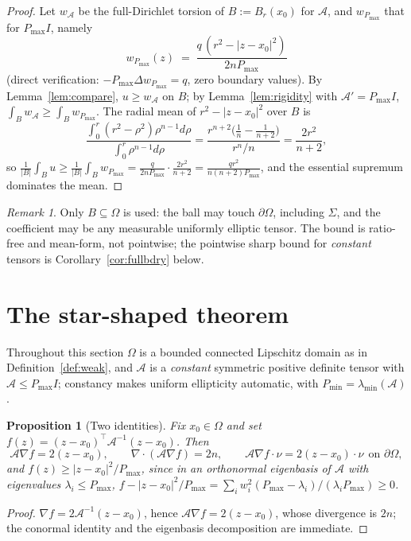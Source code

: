 \documentclass[10pt]{article}
\newtheorem{proposition}[theorem]{Proposition}
\theoremstyle{remark}
\newtheorem{remark}[theorem]{Remark}
\newcommand{\A}{\mathcal{A}}
\newcommand{\Om}{\Omega}
\newcommand{\Sig}{\Sigma}
\newcommand{\Pmax}{P_{\max}}
\newcommand{\Pmin}{P_{\min}}
\begin{document}
\begin{proof}
Let $w_\A$ be the full-Dirichlet torsion of $B:=B_r(x_0)$ for $\A$, and
$w_{\Pmax}$ that for $\Pmax I$, namely
\[
w_{\Pmax}(z)\;=\;\frac{q\,(r^2-|z-x_0|^2)}{2n\Pmax}
\]
(direct verification: $-\Pmax\Delta w_{\Pmax}=q$, zero boundary values).
By Lemma~\ref{lem:compare}, $u\ge w_\A$ on $B$; by
Lemma~\ref{lem:rigidity} with $\A'=\Pmax I$,
$\int_B w_\A\ge\int_B w_{\Pmax}$. The radial mean of $r^2-|z-x_0|^2$ over $B$
is
\[
\frac{\int_0^r (r^2-\rho^2)\rho^{n-1}d\rho}{\int_0^r \rho^{n-1}d\rho}
=\frac{r^{n+2}\bigl(\tfrac1n-\tfrac1{n+2}\bigr)}{r^n/n}
=\frac{2r^2}{n+2},
\]
so $\frac1{|B|}\int_B u\ge\frac1{|B|}\int_B w_{\Pmax}
=\frac{q}{2n\Pmax}\cdot\frac{2r^2}{n+2}=\frac{qr^2}{n(n+2)\Pmax}$, and the
essential supremum dominates the mean.
\end{proof}

\begin{remark}\label{rem:P1scope}
Only $B\subseteq\Om$ is used: the ball may touch $\partial\Om$, including
$\Sig$, and the coefficient may be any measurable uniformly elliptic tensor. The bound is ratio-free
and mean-form, not pointwise; the pointwise sharp bound for \emph{constant}
tensors is Corollary~\ref{cor:fullbdry} below.
\end{remark}

\section{The star-shaped theorem}\label{sec:star}

Throughout this section $\Om$ is a bounded connected Lipschitz domain as in
Definition~\ref{def:weak}, and $\A$ is a \emph{constant} symmetric positive
definite tensor with $\A\le\Pmax I$; constancy makes uniform ellipticity
automatic, with $\Pmin=\lambda_{\min}(\A)$.

\begin{proposition}[Two identities]\label{prop:f}
Fix $x_0\in\Om$ and set $f(z)=(z-x_0)^{\!\top}\A^{-1}(z-x_0)$. Then
\[
\A\nabla f=2(z-x_0),\qquad
\nabla\!\cdot\!(\A\nabla f)=2n,\qquad
\A\nabla f\cdot\nu=2(z-x_0)\cdot\nu\ \ \text{on }\partial\Om,
\]
and $f(z)\ge|z-x_0|^2/\Pmax$, since in an orthonormal eigenbasis of $\A$ with
eigenvalues $\lambda_i\le\Pmax$,
$f-|z-x_0|^2/\Pmax=\sum_i w_i^2(\Pmax-\lambda_i)/(\lambda_i\Pmax)\ge0$.
\end{proposition}

\begin{proof}
$\nabla f=2\A^{-1}(z-x_0)$, hence $\A\nabla f=2(z-x_0)$, whose divergence is
$2n$; the conormal identity and the eigenbasis decomposition are immediate.
\end{proof}
\end{document}
